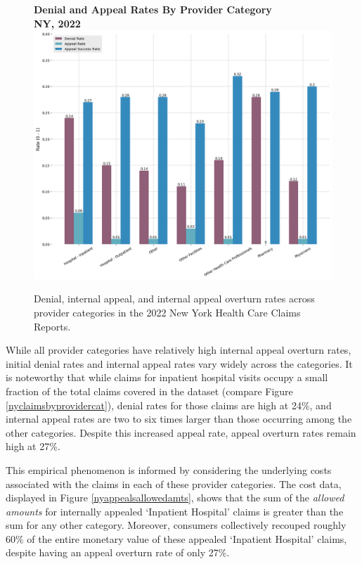 \documentclass[12pt, a4paper,twoside,parskip=full]{report}
\theoremstyle{plain} %
\theoremstyle{definition} %
\theoremstyle{remark} %
\numberwithin{equation}{chapter}
\begin{document}
		\begin{figure}[h!]
			\centering
			\textbf{Denial and Appeal Rates By Provider Category}\\
			\textbf{NY, 2022}\\
			\includegraphics[width=\columnwidth]{images/ny_claim_reports/denial_and_appeal_rates_by_provider_cat.png}
			\caption{Denial, internal appeal, and internal appeal overturn rates across provider categories in the 2022 New York Health Care Claims Reports.}
			\label{nyappealratesbyprovidercat}
		\end{figure}
	
		While all provider categories have relatively high internal appeal overturn rates, initial denial rates and internal appeal rates vary widely across the categories. It is noteworthy that while claims for inpatient hospital visits occupy a small fraction of the total claims covered in the dataset (compare Figure \ref{nyclaimsbyprovidercat}), denial rates for those claims are high at 24\%, and internal appeal rates are two to six times larger than those occurring among the other categories. Despite this increased appeal rate, appeal overturn rates remain high at 27\%.
		
		This empirical phenomenon is informed by considering the underlying costs associated with the claims in each of these provider categories. The cost data, displayed in Figure \ref{nyappealsallowedamts}, shows that the sum of the \emph{allowed amounts} for internally appealed `Inpatient Hospital' claims is greater than the sum for any other category. Moreover, consumers collectively recouped roughly 60\% of the entire monetary value of these appealed `Inpatient Hospital' claims, despite having an appeal overturn rate of only 27\%.
		
\end{document}
